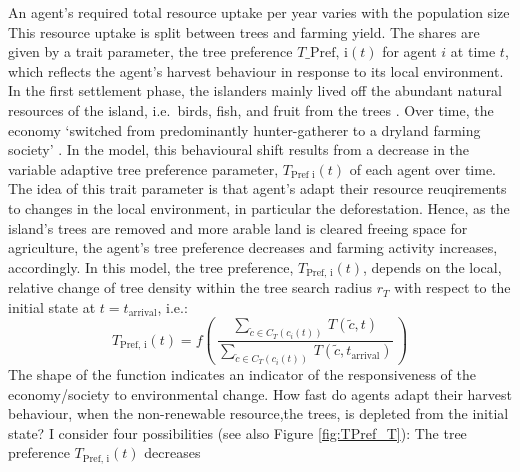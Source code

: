 An agent's required total resource uptake per year varies with the population size 
This resource uptake is split between trees and farming yield.
The shares are given by a trait parameter, the tree preference $T\_\text{Pref, i}(t)$ for agent $i$ at time $t$, which reflects the agent's harvest behaviour in response to its local environment.
In the first settlement phase, the islanders mainly lived off the abundant natural resources of the island, i.e.\ birds, fish, and fruit from the trees \citet{Bahn2017}. 
Over time, the economy `switched from predominantly hunter-gatherer to a dryland farming society' \citep{Louwagie2006}.
In the model, this behavioural shift results from a decrease in the variable adaptive tree preference parameter, $T_\text{Pref i}(t)$ of each agent over time.
The idea of this trait parameter is that agent's adapt their resource reuqirements to changes in the local environment, in particular the deforestation. 
Hence, as the island's trees are removed and more arable land is cleared freeing space for agriculture, the agent's tree preference decreases and farming activity increases, accordingly.
In this model, the tree preference, $T_\text{Pref, i}(t)$, depends on the local, relative change of tree density within the tree search radius $r_T$ with respect to the initial state at $t=t_\text{arrival}$, i.e.:
\begin{equation}
T_\text{Pref, i}(t) = f\left( \, \frac{\sum_{\tilde{c} \in C_{T}(c_i(t)) } \, T(\tilde{c}, t)}{\sum_{\tilde{c} \in C_{T}(c_i(t))} \, T(\tilde{c}, t_\text{arrival}) } \, \right)
\end{equation}
The shape of the function indicates an indicator of the responsiveness of the economy/society to environmental change. How fast do agents adapt their harvest behaviour, when the non-renewable resource,the trees, is depleted from the initial state?  
I consider four possibilities (see also Figure \ref{fig:TPref_T}): The tree preference $T_\text{Pref, i}(t)$ decreases
